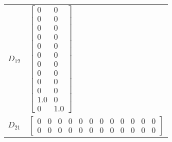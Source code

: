 \begin{tabular}{cl}
 $D_{12}$ & $\left[\begin{matrix}0 & 0\\0 & 0\\0 & 0\\0 & 0\\0 & 0\\0 & 0\\0 & 0\\0 & 0\\0 & 0\\0 & 0\\1.0 & 0\\0 & 1.0\end{matrix}\right]$                                                                                                                                                                                                                                                                                                                                                                                                                                                                                                                                                                            \\
 $D_{21}$ & $\left[\begin{array}{cccccccccccc}0 & 0 & 0 & 0 & 0 & 0 & 0 & 0 & 0 & 0 & 0 & 0\\0 & 0 & 0 & 0 & 0 & 0 & 0 & 0 & 0 & 0 & 0 & 0\end{array}\right]$                                                                                                                                                                                                                                                                                                                                                                                                                                                                                                                                                          \\
\hline
\end{tabular}